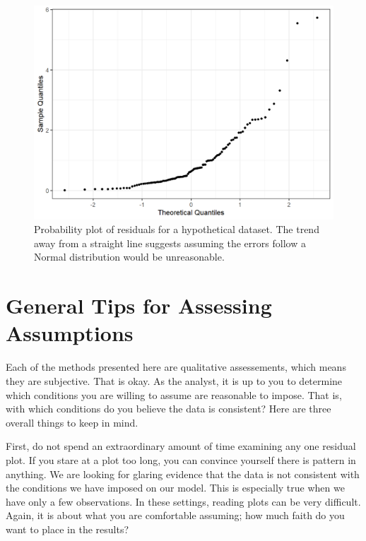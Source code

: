 \documentclass[
]{book}
\theoremstyle{plain}
\theoremstyle{mydefn}
\theoremstyle{myexmpl}
\theoremstyle{remark}
\begin{document}
\begin{figure}

{\centering \includegraphics[width=0.8\linewidth]{./Images/regassessment-normal-bad-1} 

}

\caption{Probability plot of residuals for a hypothetical dataset.  The trend away from a straight line suggests assuming the errors follow a Normal distribution would be unreasonable.}\label{fig:regassessment-normal-bad}
\end{figure}

\hypertarget{general-tips-for-assessing-assumptions}{%
\section{General Tips for Assessing Assumptions}\label{general-tips-for-assessing-assumptions}}

Each of the methods presented here are qualitative assessements, which means they are subjective. That is okay. As the analyst, it is up to you to determine which conditions you are willing to assume are reasonable to impose. That is, with which conditions do you believe the data is consistent? Here are three overall things to keep in mind.

First, do not spend an extraordinary amount of time examining any one residual plot. If you stare at a plot too long, you can convince yourself there is pattern in anything. We are looking for glaring evidence that the data is not consistent with the conditions we have imposed on our model. This is especially true when we have only a few observations. In these settings, reading plots can be very difficult. Again, it is about what you are comfortable assuming; how much faith do you want to place in the results?
\end{document}
